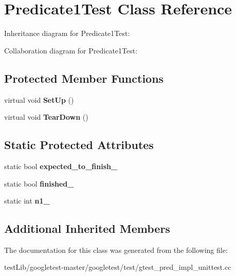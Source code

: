 \hypertarget{classPredicate1Test}{}\section{Predicate1\+Test Class Reference}
\label{classPredicate1Test}


Inheritance diagram for Predicate1\+Test\+:


Collaboration diagram for Predicate1\+Test\+:
\subsection*{Protected Member Functions}
\begin{DoxyCompactItemize}
\item 
\mbox{\label{classPredicate1Test_a481704a09f73a37158513f9a336dbdd9}} 
virtual void {\bfseries Set\+Up} ()
\item 
\mbox{\label{classPredicate1Test_ad2974af5c6abc508847c3a9912b24a90}} 
virtual void {\bfseries Tear\+Down} ()
\end{DoxyCompactItemize}
\subsection*{Static Protected Attributes}
\begin{DoxyCompactItemize}
\item 
\mbox{\label{classPredicate1Test_ad91cfa58e6352d53abacce32df2ef635}} 
static bool {\bfseries expected\+\_\+to\+\_\+finish\+\_\+}
\item 
\mbox{\label{classPredicate1Test_a6d45fb2d1f01a5c8baf28f60039c244e}} 
static bool {\bfseries finished\+\_\+}
\item 
\mbox{\label{classPredicate1Test_a528d9f7f618b17802962a3824eea11e3}} 
static int {\bfseries n1\+\_\+}
\end{DoxyCompactItemize}
\subsection*{Additional Inherited Members}


The documentation for this class was generated from the following file\+:\begin{DoxyCompactItemize}
\item 
test\+Lib/googletest-\/master/googletest/test/gtest\+\_\+pred\+\_\+impl\+\_\+unittest.\+cc\end{DoxyCompactItemize}

